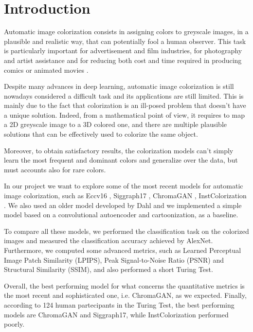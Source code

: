 \section{Introduction}
Automatic image colorization consists in assigning colors to greyscale images, in a plausible and
realistic way, that can potentially fool a human observer. This task is particularly important for advertisement
and film industries, for photography and artist assistance \cite{chromagan} and for reducing both cost and time required in producing comics or animated movies \cite{animation}.

Despite many advances in deep learning, automatic image colorization is still nowadays considered a difficult task
and its applications are still limited. This is mainly due to the fact that colorization is an ill-posed
problem that doesn't have a unique solution. Indeed, from a mathematical point of view,
it requires to map a 2D greyscale image to a 3D colored one, and there are multiple plausible solutions that can
be effectively used to colorize the same object.

Moreover, to obtain satisfactory results, the colorization models can't simply learn the most frequent and dominant colors and generalize over the data, but must accounts also for rare colors.

In our project we want to explore some of the most recent models for automatic image colorization, such as
Eccv16 \cite{zhang}, Siggraph17 \cite{siggraph}, ChromaGAN \cite{chromagan}, InstColorization \cite{su}.
We also used an older model developed by Dahl \cite{dahl} and we implemented a simple model based on a
convolutional autoencoder and cartoonization, as a baseline.

To compare all these models, we performed the classification task on the colorized images and measured the
classification accuracy achieved by AlexNet. Furthermore, we computed some advanced metrics, such as Learned Perceptual Image Patch
Similarity (LPIPS), Peak Signal-to-Noise Ratio (PSNR) and Structural Similarity (SSIM), and also performed a short
Turing Test.

Overall, the best performing model for what concerns the quantitative metrics is the most recent and sophisticated one,
i.e. ChromaGAN, as we expected. Finally, according to 124 human partecipants in the Turing Test, the best performing models
are ChromaGAN and Siggraph17, while InstColorization performed poorly.




